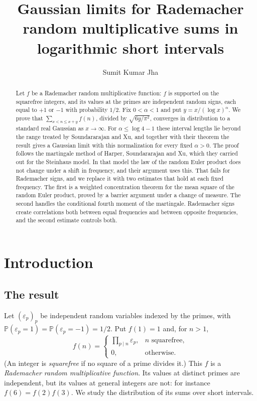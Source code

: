 \documentclass[11pt]{amsart}
\title[Rademacher sums in logarithmic short intervals]{Gaussian limits for Rademacher random multiplicative sums in logarithmic short intervals}
\author{Sumit Kumar Jha}
\theoremstyle{remark}
\numberwithin{equation}{section}
\renewcommand{\P}{\mathbb{P}}
\begin{document}
\begin{abstract}
Let $f$ be a Rademacher random multiplicative function: $f$ is supported on the squarefree integers, and its values at the primes are independent random signs, each equal to $+1$ or $-1$ with probability $1/2$. Fix $0<\alpha<1$ and put $y=x/(\log x)^\alpha$. We prove that $\sum_{x<n\le x+y}f(n)$, divided by $\sqrt{6y/\pi^2}$, converges in distribution to a standard real Gaussian as $x\to\infty$. For $\alpha\le\log4-1$ these interval lengths lie beyond the range treated by Soundararajan and Xu, and together with their theorem the result gives a Gaussian limit with this normalization for every fixed $\alpha>0$. The proof follows the martingale method of Harper, Soundararajan and Xu, which they carried out for the Steinhaus model. In that model the law of the random Euler product does not change under a shift in frequency, and their argument uses this. That fails for Rademacher signs, and we replace it with two estimates that hold at each fixed frequency. The first is a weighted concentration theorem for the mean square of the random Euler product, proved by a barrier argument under a change of measure. The second handles the conditional fourth moment of the martingale. Rademacher signs create correlations both between equal frequencies and between opposite frequencies, and the second estimate controls both.
\end{abstract}

\maketitle

\section{Introduction}\label{sec:intro}

\subsection{The result}
Let $(\varepsilon_p)_p$ be independent random variables indexed by the primes, with $\P(\varepsilon_p=1)=\P(\varepsilon_p=-1)=1/2$. Put $f(1)=1$ and, for $n>1$,
\[
f(n)=\begin{cases}\prod_{p\mid n}\varepsilon_p, & n \text{ squarefree},\\ 0, & \text{otherwise}.\end{cases}
\]
(An integer is \emph{squarefree} if no square of a prime divides it.) This $f$ is a \emph{Rademacher random multiplicative function}. Its values at distinct primes are independent, but its values at general integers are not: for instance $f(6)=f(2)f(3)$. We study the distribution of its sums over short intervals.
\end{document}
